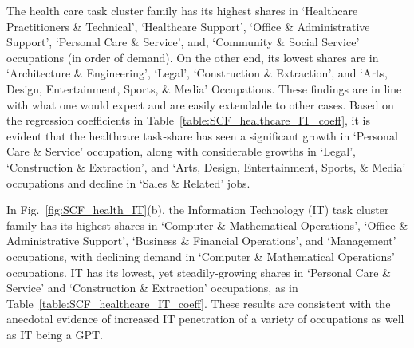 \documentclass[letterpaper]{article} %
\begin{document}
The health care task cluster family has its highest shares in `Healthcare Practitioners \& Technical', `Healthcare Support', `Office \& Administrative Support', `Personal Care \& Service', and, `Community \& Social Service' occupations (in order of demand). On the other end, its lowest shares are in `Architecture \& Engineering', `Legal', `Construction \& Extraction', and `Arts, Design, Entertainment, Sports, \& Media' Occupations. These findings are in line with what one would expect and are easily extendable to other cases. Based on the regression coefficients in Table~\ref{table:SCF_healthcare_IT_coeff}, it is evident that the healthcare task-share has seen a significant growth in `Personal Care \& Service' occupation, along with considerable growths in `Legal', `Construction \& Extraction', and `Arts, Design, Entertainment, Sports, \& Media' occupations and decline in `Sales \& Related' jobs.

In Fig.~\ref{fig:SCF_health_IT}(b), the Information Technology (IT) task cluster family has its highest shares in `Computer \& Mathematical Operations', `Office \& Administrative Support', `Business \& Financial Operations', and `Management' occupations, with declining demand in `Computer \& Mathematical Operations' occupations. IT has its lowest, yet steadily-growing shares in `Personal Care \& Service' and `Construction \& Extraction' occupations, as in Table~\ref{table:SCF_healthcare_IT_coeff}. These results are consistent with the anecdotal evidence of increased IT penetration of a variety of occupations as well as IT being a GPT.
\end{document}
